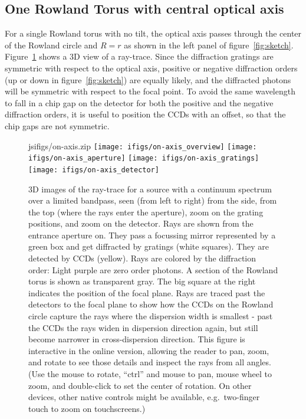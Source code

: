 \documentclass[linenumbers]{aastex631}
\begin{document}
\subsection{One Rowland Torus with central optical axis}
\label{sect:onetorus}
For a single Rowland torus with no tilt, the optical axis passes through the center of the Rowland circle and $R=r$ as shown in the left panel of figure~\ref{fig:sketch}. Figure~\ref{fig:3d:single} shows a 3D view of a ray-trace. Since the diffraction gratings are symmetric with respect to the optical axis, positive or negative diffraction orders (up or down in figure~\ref{fig:sketch}) are equally likely, and the diffracted photons will be symmetric with respect to the focal point. To avoid the same wavelength to fall in a chip gap on the detector for both the positive and the negative diffraction orders, it is useful to position the CCDs with an offset, so that the chip gaps are not symmetric.
\begin{figure}
  \begin{interactive}{js}{ifigs/on-axis.zip}
  \texttt{[image: ifigs/on-axis\_overview]}
  \texttt{[image: ifigs/on-axis\_aperture]}
  \texttt{[image: ifigs/on-axis\_gratings]}
  \texttt{[image: ifigs/on-axis\_detector]}
  \end{interactive}
\caption{3D images of the ray-trace for a source with a continuum spectrum over a limited bandpass, seen (from left to right) from the side, from the top (where the rays enter the aperture), zoom on the grating positions, and zoom on the detector. Rays are shown from the entrance aperture on. They pass a focussing mirror represented by a green box and get diffracted by gratings (white squares). They are detected by CCDs (yellow). Rays are colored by the diffraction order: Light purple are zero order photons. A section of the Rowland torus is shown as transparent gray. The big square at the right indicates the position of the focal plane. Rays are traced past the detectors to the focal plane to show how the CCDs on the Rowland circle capture the rays where the dispersion width is smallest - past the CCDs the rays widen in dispersion direction again, but still become narrower in cross-dispersion direction. This figure is interactive in the online version, allowing the reader to pan, zoom, and rotate to see those details and inspect the rays from all angles. (Use the mouse to rotate, ``ctrl'' and mouse to pan, mouse wheel to zoom, and double-click to set the center of rotation. On other devices, other native controls might be available, e.g.\ two-finger touch to zoom on touchscreens.)
\label{fig:3d:single}}

\end{figure}
\end{document}

